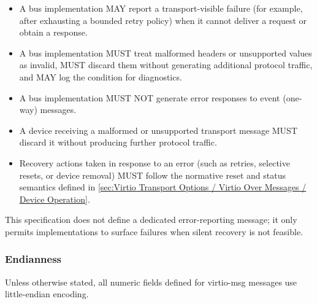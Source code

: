 \begin{itemize}
  \item A bus implementation MAY report a transport-visible failure (for example, after exhausting
        a bounded retry policy) when it cannot deliver a request or obtain a response.
  \item A bus implementation MUST treat malformed headers or unsupported  values as
        invalid, MUST discard them without generating additional protocol traffic, and MAY log the
        condition for diagnostics.
  \item A bus implementation MUST NOT generate error responses to event (one-way) messages.
\end{itemize}

\begin{itemize}
  \item A device receiving a malformed or unsupported transport message MUST discard it without
        producing further protocol traffic.
  \item Recovery actions taken in response to an error (such as retries, selective resets, or device
        removal) MUST follow the normative reset and status semantics defined in
        \ref{sec:Virtio Transport Options / Virtio Over Messages / Device Operation}.
\end{itemize}

This specification does not define a dedicated error-reporting message; it only permits implementations
to surface failures when silent recovery is not feasible.

\subsubsection{Endianness}
\label{sec:Virtio Transport Options / Virtio Over Messages / Basic Concepts / Endianness}

Unless otherwise stated, all numeric fields defined for virtio-msg messages use
little-endian encoding.

